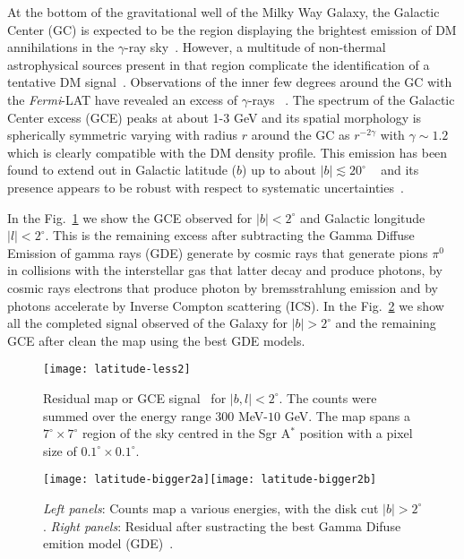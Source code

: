 At the bottom of the gravitational well of the Milky Way Galaxy, the Galactic Center (GC) is expected to be the region displaying the brightest emission of DM annihilations in the $\gamma$-ray sky~\cite{Funk:review}.
 However, a multitude of non-thermal astrophysical sources present in that region complicate the identification of a tentative DM signal~\cite{Funk:review}. Observations of the inner few degrees around the GC with the \textit{Fermi}-LAT have revealed an excess of $\gamma$-rays ~\cite{Goodenough2009gk,Vitale:2009hr,Hooper:2010mq,hooper,AbazajianKaplinghat2012,AbazajianKaplinghat2013,GordonMacias2013}. 
The spectrum of the Galactic Center excess (GCE) peaks at about 1-3 GeV and its spatial morphology is spherically symmetric varying with radius $r$ around the GC as $r^{-2\gamma}$ with  $\gamma\sim 1.2$ which is clearly compatible with the DM density profile. 
This emission has been found to extend out in Galactic latitude ($b$) up to about $|b|\lesssim 20^\circ$ ~\cite{hooperslatyer2013,Daylan:2014,CaloreCholisWeniger2015,TheFermi-LAT:2015kwa} and its presence appears  to be robust with respect to systematic uncertainties~\cite{GordonMacias2013,MaciasGordon2014,Daylan:2014,Zho2015,CaloreCholisWeniger2015,PorterMurgia2015,TheFermi-LAT:2015kwa}.

In the Fig.~\ref{fig:GCE-less2} we show the GCE observed for $|b|<2^{\circ}$ and Galactic longitude $|l|<2^{\circ}$. This is the remaining excess after subtracting the Gamma Diffuse Emission of gamma rays (GDE) generate by cosmic rays that generate pions $\pi^0$ in collisions with the interstellar gas that latter decay and produce photons, by cosmic rays electrons that produce photon by bremsstrahlung emission and by photons accelerate by Inverse Compton scattering (ICS).
In the Fig.~\ref{fig:GCE-bigger2} we show all the completed signal observed of the Galaxy for   $|b|>2^{\circ}$ and the remaining GCE after clean the map using the best GDE models. 

\begin{figure}[h]
\begin{center}
\texttt{[image: latitude-less2]}
\end{center}
\caption{Residual map or GCE signal~\cite{GordonMacias2013} for $|b,l|<2^{\circ}$. The counts were summed over the energy range 
$300$ MeV-$10$ GeV. The map spans a $7^{\circ}\times 7^{\circ}$ region of the sky centred in the Sgr A$^*$ position with a pixel size of $0.1^{\circ}\times 0.1^{\circ}$.}
\label{fig:GCE-less2}
\end{figure}
%
\begin{figure}[h]
\begin{center}
\texttt{[image: latitude-bigger2a]}\texttt{[image: latitude-bigger2b]}
\end{center}
\caption{\textit{Left panels}: Counts map a various energies, with the disk cut $|b|>2^{\circ}$. \textit{Right panels}: Residual after sustracting the best Gamma Difuse emition model (GDE)~\cite{CaloreCholisWeniger2015}.}
\label{fig:GCE-bigger2}
\end{figure} 
 

